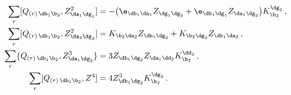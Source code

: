 \begin{equation}\label{2Z234}
\begin{split}
\sum_r[Q_{(r)\,\db_1\b_2},Z^2_{\da_1\dg_1}] & =
-\bigl(\e_{\db_1\da_1}Z_{\dg_1\dg_2}+\e_{\db_1\dg_1}Z_{\da_1\dg_2}\bigr)K_{\b_2}^{\dg_2}\,,\\
\sum_r[Q_{(r)\,\db_1\b_2},Z^2_{\da_2\dg_2}] & =
K_{\b_2\da_2}Z_{\db_1\dg_2}+K_{\b_2\dg_2}Z_{\db_1\da_2}\,,\\
\sum_r\{Q_{(r)\,\db_1\b_2},Z^3_{\da_1\dg_2}\} & =
3Z_{\db_1\dg_2}Z_{\da_1\dd_2}K^{\dd_2}_{\b_2}\,,\\
\sum_r[Q_{(r)\,\db_1\b_2},Z^4] & =
4Z^3_{\db_1\dg_2}K^{\dg_2}_{\b_2}\,.
\end{split}
\end{equation}

